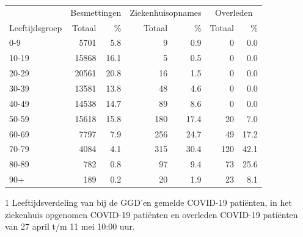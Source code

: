 \documentclass[
  english,
  man,floatsintext]{apa6}
\begin{document}
\begin{table}
\centering\begingroup\fontsize{11}{13}\selectfont

\begin{threeparttable}
\begin{tabular}{lrrrrrr}
\toprule
\multicolumn{1}{c}{ } & \multicolumn{2}{c}{Besmettingen} & \multicolumn{2}{c}{Ziekenhuisopnames} & \multicolumn{2}{c}{Overleden} \\
\cmidrule(l{3pt}r{3pt}){2-3} \cmidrule(l{3pt}r{3pt}){4-5} \cmidrule(l{3pt}r{3pt}){6-7}
Leeftijdsgroep & Totaal & \% & Totaal & \% & Totaal & \%\\
\midrule
0-9 & 5701 & 5.8 & 9 & 0.9 & 0 & 0.0\\
10-19 & 15868 & 16.1 & 5 & 0.5 & 0 & 0.0\\
20-29 & 20561 & 20.8 & 16 & 1.5 & 0 & 0.0\\
30-39 & 13581 & 13.8 & 48 & 4.6 & 0 & 0.0\\
40-49 & 14538 & 14.7 & 89 & 8.6 & 0 & 0.0\\
50-59 & 15618 & 15.8 & 180 & 17.4 & 20 & 7.0\\
60-69 & 7797 & 7.9 & 256 & 24.7 & 49 & 17.2\\
70-79 & 4084 & 4.1 & 315 & 30.4 & 120 & 42.1\\
80-89 & 782 & 0.8 & 97 & 9.4 & 73 & 25.6\\
90+ & 189 & 0.2 & 20 & 1.9 & 23 & 8.1\\
\bottomrule
\end{tabular}
\begin{tablenotes}
\item[1] Leeftijdsverdeling van bij de GGD’en gemelde COVID-19 patiënten, in het ziekenhuis opgenomen COVID-19 patiënten en overleden COVID-19 patiënten van 27 april t/m 11 mei 10:00 uur.
\end{tablenotes}
\end{threeparttable}
\endgroup{}
\end{table}

\newpage
\end{document}
